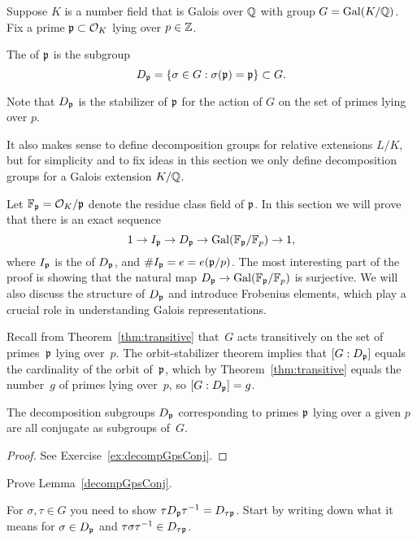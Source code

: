 Suppose $K$ is a number field that is Galois over $\mathbb{Q}$ with
group $G=\operatorname{Gal}(K/\mathbb{Q})$. Fix a prime $\mathfrak{p}\subset \mathcal{O}_K$ lying over $p\in\mathbb{Z}$.
\begin{definition}\label{def:decomp}
	The  of $\mathfrak{p}$ is the subgroup
	$$
		D_{\mathfrak{p}} = \{\sigma \in G : \sigma(\mathfrak{p})=\mathfrak{p}\} \subset G.
	$$
\end{definition}
Note that $D_{\mathfrak{p}}$ is the stabilizer of $\mathfrak{p}$ for
the action of $G$ on the set of primes lying over $p$.

It also makes sense to define decomposition groups for relative
extensions $L/K$, but for simplicity and to fix ideas in this section
we only define decomposition groups for a Galois extension $K/\mathbb{Q}$.

Let $\mathbb{F}_{\mathfrak{p}} = \mathcal{O}_K/\mathfrak{p}$ denote the residue class field of $\mathfrak{p}$.
In this section we will prove that there is an exact sequence
$$
	1\to I_{\mathfrak{p}} \to D_{\mathfrak{p}} \to \operatorname{Gal}(\mathbb{F}_{\mathfrak{p}}/\mathbb{F}_p)\to 1,
$$
where $I_{\mathfrak{p}}$ is the  of $D_{\mathfrak{p}}$, and $\#I_{\mathfrak{p}}=e = e(\mathfrak{p}/p)$.
The most interesting part of the proof is showing that the natural
map $D_{\mathfrak{p}}\to  \operatorname{Gal}(\mathbb{F}_{\mathfrak{p}}/\mathbb{F}_p)$ is surjective.
We will also discuss the structure of $D_{\mathfrak{p}}$ and introduce
Frobenius elements, which play a crucial role in understanding Galois
representations.


Recall from Theorem~\ref{thm:transitive} that~$G$ acts transitively
on the set of primes~$\mathfrak{p}$ lying over~$p$.
The orbit-stabilizer theorem implies that $[G:D_{\mathfrak{p}}]$ equals the
cardinality of the orbit of~$\mathfrak{p}$, which by Theorem~\ref{thm:transitive}
equals the number~$g$ of primes lying over~$p$, so $[G:D_{\mathfrak{p}}]=g$.

\begin{lemma}\label{decompGpsConj}
	The decomposition subgroups $D_{\mathfrak{p}}$ corresponding to primes $\mathfrak{p}$
	lying over a given $p$ are all conjugate as subgroups of~$G$.
\end{lemma}
\begin{proof}
	See Exercise~\ref{ex:decompGpsConj}.
\end{proof}

\begin{exercise}\label{ex:decompGpsConj}
	Prove Lemma~\ref{decompGpsConj}.

	\begin{hint}
		For $\sigma,\tau\in G$ you need to show
		$\tau D_{\mathfrak{p}} \tau^{-1} = D_{\tau\mathfrak{p}}$.
		Start by writing down what it means for $\sigma\in D_{\mathfrak{p}}$
		and $\tau\sigma\tau^{-1}\in D_{\tau\mathfrak{p}}$.
	\end{hint}
\end{exercise}

